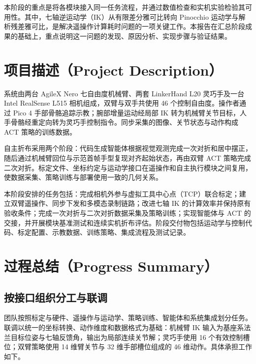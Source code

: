 \documentclass[UTF8,a4paper,zihao=-4]{ctexart}
\begin{document}
本阶段的重点是将各模块接入同一任务流程，并通过数值检查和实机实验检验其可用性。其中，七轴逆运动学（IK）从有限差分雅可比转向 Pinocchio 运动学与解析残差雅可比，是解决遥操作计算耗时问题的一项关键工作。本报告在汇总阶段成果的基础上，重点说明这一问题的发现、原因分析、实现步骤与验证结果。

\section{项目描述（Project Description）}

系统由两台 AgileX Nero 七自由度机械臂、两套 LinkerHand L20 灵巧手及一台 Intel RealSense L515 相机组成，双臂与双手共使用 46 个控制自由度。操作者通过 Pico 4 手部骨骼追踪示教；腕部增量运动经局部 IK 转为机械臂关节目标，人手骨骼经重定向转为灵巧手控制指令。同步采集的图像、关节状态与动作构成 ACT 策略的训练数据。

自主折布采用两个阶段：代码生成智能体根据视觉观测完成一次对折和居中摆正，随后通过机械臂回位与示范首帧手型复现对齐起始状态，再由双臂 ACT 策略完成二次对折。标定文件、坐标约定与运动学接口在遥操作和自主执行模块之间复用，使数据采集、策略训练与部署使用一致的几何关系。

本阶段安排的任务包括：完成相机外参与虚拟工具中心点（TCP）联合标定；建立双臂遥操作、同步下发和多模态录制链路；改进七轴 IK 的计算效率并保持原有验收条件；完成一次对折与二次对折数据采集及策略训练；实现智能体与 ACT 的交接，并开展模块基准测试和连续实机折布评估。阶段交付物包括运动学与控制代码、标定配置、示教数据、训练策略、集成流程及测试记录。

\newpage
\section{过程总结（Progress Summary）}

\subsection{按接口组织分工与联调}

团队按照标定与硬件、遥操作与运动学、策略训练、智能体和系统集成划分任务。联调以统一的坐标转换、动作维度和数据格式为基础：机械臂 IK 输入为基座系法兰目标位姿与七轴反馈角，输出为局部连续关节解；灵巧手使用 16 个有效控制槽位；双臂策略使用 14 维臂关节与 32 维手部槽位组成的 46 维动作。具体承担工作如下。
\end{document}
